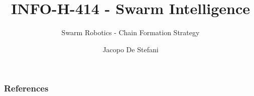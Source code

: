 \documentclass{beamer}
\author{Jacopo De Stefani}
\title{INFO-H-414 - Swarm Intelligence}
\subtitle{Swarm Robotics - Chain Formation Strategy}
\institute{Universite' Libre de Bruxelles}
\begin{document}
\begin{frame}[t,plain]
\titlepage
\end{frame}



\begin{frame}[allowframebreaks]
         \frametitle{References}
         
         
\end{frame}
\end{document}
